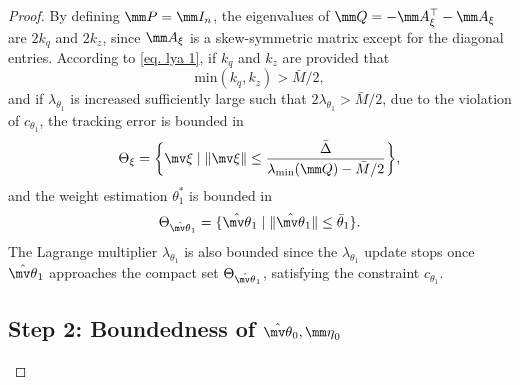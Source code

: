 \documentclass[letterpaper, 10 pt, conference]{ieeeconf}  %
\begin{document}
\begin{proof}
By defining $\mm P=\mm I_n$, the eigenvalues of $\mm Q=-\mm A_\xi^\top -\mm A_\xi$ are $2k_q$ and $2k_z$, since $\mm A_\xi$ is a skew-symmetric matrix except for the diagonal entries.
According to \eqref{eq. lya 1}, if $k_q$ and $k_z$ are provided that
\begin{equation}
    \text{min}(k_q,k_z)>\bar M/2
    ,
    \label{eq. ctrl stable condition}
\end{equation}
and if $\lambda_{\theta_1}$ is increased sufficiently large such that $2\lambda_{\theta_1}>\bar M/2$, due to the violation of $c_{\theta_1}$, the tracking error is bounded in
\begin{equation}
    \Theta_\xi = 
    \bigg\{
        \mv\xi\mid\Vert\mv\xi\Vert \le  
        {
            \bar \Delta \over \lambda _\text{min}(\mm Q)-\bar M/2
        } 
    \bigg\}
    ,
\end{equation}
and the weight estimation $\theta^*_1$ is bounded in
\begin{equation}
    \Theta_{{\hat{\mv\theta}}_1} = 
    \{ 
        {\hat{\mv\theta}_1} 
        \mid
        \Vert{\hat{\mv\theta}_1}\Vert 
        \le  
        \bar\theta_1
    \}
    .
\end{equation}
The Lagrange multiplier $\lambda_{\theta_1}$ is also bounded since the $\lambda_{\theta_1}$ update stops once ${\hat{\mv\theta}}_1$ approaches the compact set $\Theta_{{\hat{\mv\theta}}_1}$, satisfying the constraint $c_{\theta_1}$.

\subsection*{Step 2: Boundedness of ${\hat{\mv\theta}}_0,{\mm \eta}_0$}


\end{proof}
\end{document}
